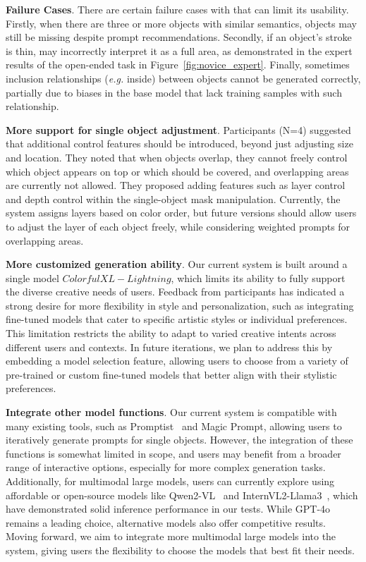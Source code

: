     \textbf{Failure Cases}. There are certain failure cases with \tool that can limit its usability. 
    Firstly, when there are three or more objects with similar semantics, objects may still be missing despite prompt recommendations. 
    Secondly, if an object's stroke is thin, \tool may incorrectly interpret it as a full area, as demonstrated in the expert results of the open-ended task in Figure~\ref{fig:novice_expert}. 
    Finally, sometimes inclusion relationships (\textit{e.g.} inside) between objects cannot be generated correctly, partially due to biases in the base model that lack training samples with such relationship. 

    \textbf{More support for single object adjustment}.
    Participants (N=4) suggested that additional control features should be introduced, beyond just adjusting size and location. They noted that when objects overlap, they cannot freely control which object appears on top or which should be covered, and overlapping areas are currently not allowed.
    They proposed adding features such as layer control and depth control within the single-object mask manipulation. Currently, the system assigns layers based on color order, but future versions should allow users to adjust the layer of each object freely, while considering weighted prompts for overlapping areas.

    \textbf{More customized generation ability}.
    Our current system is built around a single model $ColorfulXL-Lightning$, which limits its ability to fully support the diverse creative needs of users. Feedback from participants has indicated a strong desire for more flexibility in style and personalization, such as integrating fine-tuned models that cater to specific artistic styles or individual preferences. 
    This limitation restricts the ability to adapt to varied creative intents across different users and contexts.
    In future iterations, we plan to address this by embedding a model selection feature, allowing users to choose from a variety of pre-trained or custom fine-tuned models that better align with their stylistic preferences. 
    
    \textbf{Integrate other model functions}.
    Our current system is compatible with many existing tools, such as Promptist~\cite{hao2024optimizing} and Magic Prompt, allowing users to iteratively generate prompts for single objects. However, the integration of these functions is somewhat limited in scope, and users may benefit from a broader range of interactive options, especially for more complex generation tasks. Additionally, for multimodal large models, users can currently explore using affordable or open-source models like Qwen2-VL~\cite{qwen} and InternVL2-Llama3~\cite{llama}, which have demonstrated solid inference performance in our tests. While GPT-4o remains a leading choice, alternative models also offer competitive results.
    Moving forward, we aim to integrate more multimodal large models into the system, giving users the flexibility to choose the models that best fit their needs. 
    


